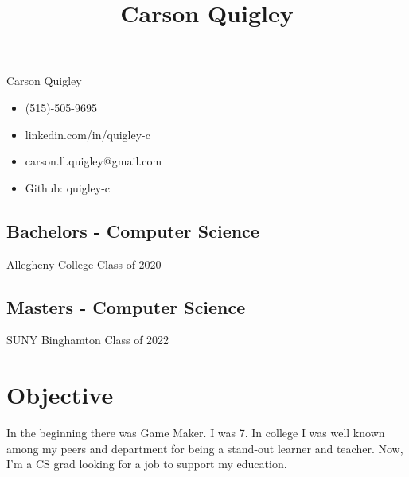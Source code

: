 \documentclass[12pt]{article}
\title{Carson Quigley}
\date{}
\begin{document}
\pagestyle{empty}

\begin{multicols}{3}

\begingroup
    \LARGE Carson Quigley\\[0em]
\endgroup

\vfill\null

\begin{itemize}
    \item[] (515)-505-9695
    \item[] linkedin.com/in/quigley-c

\vfill\null

    \item[] carson.ll.quigley@gmail.com
    \item[] Github: quigley-c

\vfill\null

\end{itemize}
\end{multicols}

\vspace{-1.5em}
\noindent\makebox[\linewidth]{\rule{\paperwidth}{0.4pt}}

\begingroup
\centering
\begin{multicols}{2}
\subsection*{Bachelors - Computer Science}
Allegheny College Class of 2020

\subsection*{Masters - Computer Science}
SUNY Binghamton Class of 2022

\end{multicols}
\endgroup

\begingroup
\centering
\section*{Objective}
In the beginning there was Game Maker. I was 7. In college I was well known among
my peers and department for being a stand-out learner and teacher. Now, I'm a CS
grad looking for a job to support my education.
\endgroup

\hspace{1cm}
\end{document}
